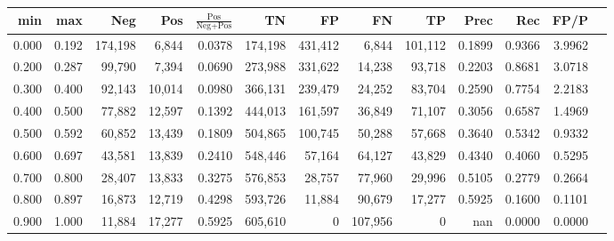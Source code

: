 \begin{tabular}{rrrrrrrrrrrrr}
\toprule
  min &   max &     Neg &    Pos & $\frac{\text{Pos}}{\text{Neg}+\text{Pos}}$ &      TN &      FP &      FN &      TP &   Prec &    Rec &   FP/P \\
\midrule
0.000 & 0.192 & 174,198 &  6,844 &                                     0.0378 & 174,198 & 431,412 &   6,844 & 101,112 & 0.1899 & 0.9366 & 3.9962 \\
0.200 & 0.287 &  99,790 &  7,394 &                                     0.0690 & 273,988 & 331,622 &  14,238 &  93,718 & 0.2203 & 0.8681 & 3.0718 \\
0.300 & 0.400 &  92,143 & 10,014 &                                     0.0980 & 366,131 & 239,479 &  24,252 &  83,704 & 0.2590 & 0.7754 & 2.2183 \\
0.400 & 0.500 &  77,882 & 12,597 &                                     0.1392 & 444,013 & 161,597 &  36,849 &  71,107 & 0.3056 & 0.6587 & 1.4969 \\
0.500 & 0.592 &  60,852 & 13,439 &                                     0.1809 & 504,865 & 100,745 &  50,288 &  57,668 & 0.3640 & 0.5342 & 0.9332 \\
0.600 & 0.697 &  43,581 & 13,839 &                                     0.2410 & 548,446 &  57,164 &  64,127 &  43,829 & 0.4340 & 0.4060 & 0.5295 \\
0.700 & 0.800 &  28,407 & 13,833 &                                     0.3275 & 576,853 &  28,757 &  77,960 &  29,996 & 0.5105 & 0.2779 & 0.2664 \\
0.800 & 0.897 &  16,873 & 12,719 &                                     0.4298 & 593,726 &  11,884 &  90,679 &  17,277 & 0.5925 & 0.1600 & 0.1101 \\
0.900 & 1.000 &  11,884 & 17,277 &                                     0.5925 & 605,610 &       0 & 107,956 &       0 &    nan & 0.0000 & 0.0000 \\
\bottomrule
\end{tabular}
